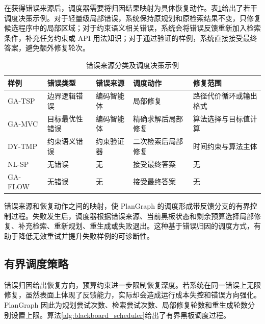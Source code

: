 在获得错误来源后，调度器需要将归因结果映射为具体恢复动作。表\ref{tab:scheduler_decision_examples}给出了若干调度决策示例。对于轻量级局部错误，系统保持原规划和原检索结果不变，只修复候选程序中的局部区域；对于约束语义相关错误，系统会将错误反馈重新加入检索条件，补充任务约束或 API 用法知识；对于通过验证的样例，系统直接接受最终答案，避免额外修复轮次。

\begin{table}[htbp]
\centering
\small
\caption{错误来源分类及调度决策示例}
\label{tab:scheduler_decision_examples}
\renewcommand{\arraystretch}{1.12}
\begin{tabularx}{\textwidth}{
>{\raggedright\arraybackslash}p{2.2cm}
>{\raggedright\arraybackslash}p{3.0cm}
>{\raggedright\arraybackslash}p{2.5cm}
>{\raggedright\arraybackslash}p{2.6cm}
>{\raggedright\arraybackslash}X}
\toprule
样例 & 错误类型 & 错误来源 & 调度动作 & 修复范围 \\
\midrule
GA-TSP & 边界逻辑错误 & 编码智能体 & 局部修复 & 路径代价循环或输出格式 \\
GA-MVC & 目标最优性错误 & 编码智能体 & 精确求解后局部修复 & 算法选择与目标值计算 \\
DY-TMP& 约束语义错误 & 约束验证器 & 二次检索后局部修复 & 时间约束与算法主体 \\
NL-SP & 无错误 & 无 & 接受最终答案 & 无 \\
GA-FLOW & 无错误 & 无 & 接受最终答案 & 无 \\
\bottomrule
\end{tabularx}
\end{table}

错误来源和恢复动作之间的映射，使 PlanGraph 的调度形成带反馈分支的有界控制过程。失败发生后，调度器根据错误来源、当前黑板状态和剩余预算选择局部修复、补充检索、重新规划、重生成或失败退出。这种基于错误归因的调度方式，有助于降低无效重试并提升失败样例的可诊断性。

\subsection{有界调度策略}

错误归因给出恢复方向，预算约束进一步限制恢复深度。若系统在同一错误上无限修复，虽然表面上体现了反馈能力，实际却会造成运行成本失控和错误方向强化。PlanGraph 因此为规划尝试次数、检索尝试次数、局部修复轮数和重生成轮数分别设置上限。算法\ref{alg:blackboard_scheduler}给出了有界黑板调度过程。

